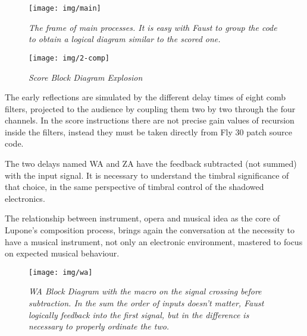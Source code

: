 \documentclass[twoside,a4paper]{article}
\begin{document}
\begin{figure}[hb]
\centerline{\texttt{[image: img/main]}}
\caption{\label{ml-main}{\it The frame of main processes. It is easy with Faust to group the code to obtain a logical diagram similar to the scored one. }}
\end{figure}


\begin{figure}[ht]
\centerline{\texttt{[image: img/2-comp]}}
\caption{\label{ml-dia-exp}{\it Score Block Diagram Explosion}}
\end{figure}

The early reflections are simulated by the different delay times of eight comb filters, projected to the audience by coupling them two by two through the four channels. In the score instructions there are not precise gain values of recursion inside the filters, instead they must be taken directly from Fly 30 patch source code.

The two delays named WA and ZA have the feedback subtracted (not summed) with the input signal. It is necessary to understand the timbral significance of that choice, in the same perspective of timbral control of the shadowed electronics.

The relationship between instrument, opera and musical idea as the core of Lupone's composition process, brings again the conversation at the necessity to have a musical instrument, not only an electronic environment, mastered to focus on expected musical behaviour.



\begin{figure}[ht]
\centerline{\texttt{[image: img/wa]}}
\caption{\label{wa-block}{\it WA Block Diagram with the macro on the signal crossing before subtraction. In the sum the order of inputs doesn't matter, Faust logically feedback into the first signal, but in the difference is necessary to properly ordinate the two.}}
\end{figure}

\end{document}
